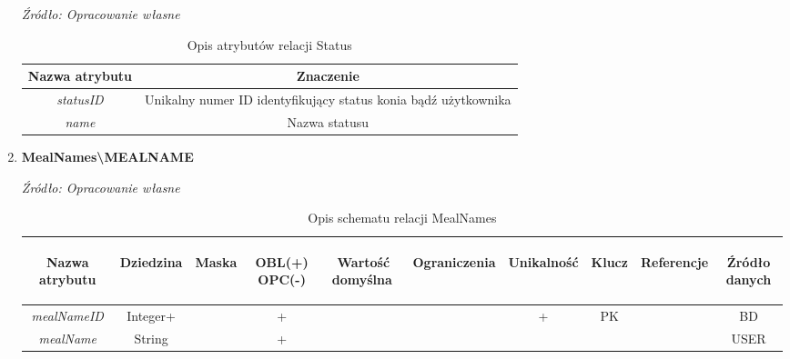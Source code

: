 \documentclass[12pt,twoside]{report}
\begin{document}
\begin{enumerate}[start=10,label={\bfseries REL\textbackslash\arabic*}]
	\begin{table}[H]
		\caption{Opis atrybutów relacji Status}
		\textit{Źródło: Opracowanie własne}
		\label{StatusAttributeDescription}
		\centering
		\begin{tabular}{|c|c|}
			\hline
			Nazwa atrybutu & Znaczenie \\
			\hline
		    \textit{statusID}&Unikalny numer ID identyfikujący status konia bądź użytkownika\\	
			\hline			
			\textit{name}& Nazwa statusu\\	
			\hline
		\end{tabular}
	\end{table}
	\item \textbf{MealNames\textbackslash MEALNAME} 
	\begin{table}[H]
		\caption{Opis schematu relacji MealNames}
		\textit{Źródło: Opracowanie własne}
		\label{MealNamesRelationSchema}
		\centering
		\begin{tabular}{|c|c|c|c|c|c|c|c|c|c|}
			\hline
			\begin{sideways}Nazwa atrybutu\end{sideways}& 
			\begin{sideways}Dziedzina \end{sideways}& 
			\begin{sideways}Maska \end{sideways}& 
			\begin{sideways}OBL(+) OPC(-)\end{sideways} & 
			\begin{sideways}Wartość domyślna$\ $\end{sideways}& 
			\begin{sideways}Ograniczenia\end{sideways} &
			\begin{sideways}Unikalność \end{sideways}& 
			\begin{sideways}Klucz \end{sideways}& 
			\begin{sideways}Referencje \end{sideways}&
			\begin{sideways}Źródło danych\end{sideways}\\
			\hline			
			\textit{mealNameID}&Integer+&&+&&&+&PK&&BD\\	
			\hline			
			\textit{mealName}&String&&+&&&&&&USER\\	
			\hline
		\end{tabular}
	\end{table}
	

\end{enumerate}
\end{document}
